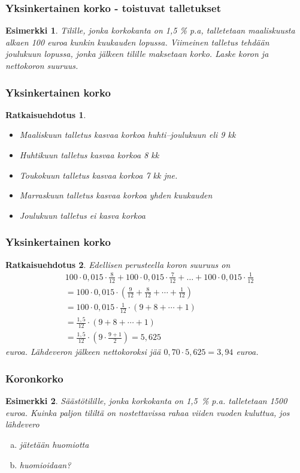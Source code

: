 \documentclass[]{beamer}\usepackage[]{graphicx}\usepackage[]{color}
\newtheorem{esim}{Esimerkki}
\newtheorem{ratkaisu}{Ratkaisuehdotus}
\begin{document}
\begin{frame}
    \frametitle{Yksinkertainen korko - toistuvat talletukset}
    \begin{esim}
        Tilille, jonka korkokanta on 1,5 \% p.a, talletetaan maaliskuusta alkaen 100 euroa kunkin kuukauden lopussa.
        Viimeinen talletus tehdään joulukuun lopussa, jonka jälkeen tilille maksetaan korko. Laske koron ja nettokoron suuruus.
    \end{esim}
\end{frame}

\begin{frame}
    \frametitle{Yksinkertainen korko}
	\begin{ratkaisu}
		\begin{itemize}
			\item Maaliskuun talletus kasvaa korkoa huhti--joulukuun eli 9 kk
			\item Huhtikuun talletus kasvaa korkoa 8 kk
			\item Toukokuun talletus kasvaa korkoa 7 kk jne.
			\item Marraskuun talletus kasvaa korkoa yhden kuukauden
			\item Joulukuun talletus ei kasva korkoa
		\end{itemize}
	\end{ratkaisu}
\end{frame}

\begin{frame}
\frametitle{Yksinkertainen korko}
	\begin{ratkaisu}		
		Edellisen perusteella koron suuruus on\pause 
		\begin{align*}
			&100\cdot0,015\cdot\frac{8}{12}+100\cdot0,015\cdot\frac{7}{12}+\ldots+100\cdot0,015\cdot\frac{1}{12} \\
			&= 100\cdot0,015\cdot\left(\frac{9}{12} + \frac{8}{12} + \cdots +\frac{1}{12}\right)\\
			&= 100\cdot0,015\cdot\frac{1}{12}\cdot(9+8+\cdots+1)\\
			&= \frac{1,5}{12}\cdot(9+8+\cdots+1)\\
			&= \frac{1,5}{12}\cdot\left( 9\cdot\frac{9+1}{2}\right) = 5,625
		\end{align*}
		euroa. \pause Lähdeveron jälkeen nettokoroksi jää \(0,70\cdot5,625=3,94\) euroa.
	\end{ratkaisu}
\end{frame}

\begin{frame}
\frametitle{Koronkorko}
	\begin{esim}
		Säästötilille, jonka korkokanta on 1,5~\% p.a. talletetaan 1500 euroa.
		Kuinka paljon tililtä on nostettavissa rahaa viiden vuoden kuluttua, jos lähdevero
		\begin{enumerate}[(a)]
			\item jätetään huomiotta
			\item huomioidaan?
		\end{enumerate}
	\end{esim}
\end{frame}
\end{document}
